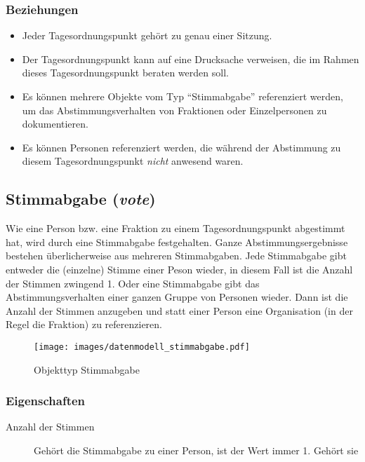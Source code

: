 \documentclass[,a4paper]{article}
\makeatletter
\def\maxwidth{\ifdim\Gin@nat@width>\linewidth\linewidth
\else\Gin@nat@width\fi}
\let\Oldincludegraphics\includegraphics
\renewcommand{\includegraphics}[1]{\Oldincludegraphics[width=\maxwidth]{#1}}
\makeatother
\begin{document}
\subsubsection{Beziehungen}

\begin{itemize}
\item
  Jeder Tagesordnungspunkt gehört zu genau einer Sitzung.
\item
  Der Tagesordnungspunkt kann auf eine Drucksache verweisen, die im
  Rahmen dieses Tagesordnungspunkt beraten werden soll.
\item
  Es können mehrere Objekte vom Typ ``Stimmabgabe'' referenziert werden,
  um das Abstimmungsverhalten von Fraktionen oder Einzelpersonen zu
  dokumentieren.
\item
  Es können Personen referenziert werden, die während der Abstimmung zu
  diesem Tagesordnungspunkt \emph{nicht} anwesend waren.
\end{itemize}

\subsection{Stimmabgabe (\emph{vote})}

Wie eine Person bzw. eine Fraktion zu einem Tagesordnungspunkt
abgestimmt hat, wird durch eine Stimmabgabe festgehalten. Ganze
Abstimmungsergebnisse bestehen überlicherweise aus mehreren
Stimmabgaben. Jede Stimmabgabe gibt entweder die (einzelne) Stimme einer
Peson wieder, in diesem Fall ist die Anzahl der Stimmen zwingend 1. Oder
eine Stimmabgabe gibt das Abstimmungsverhalten einer ganzen Gruppe von
Personen wieder. Dann ist die Anzahl der Stimmen anzugeben und statt
einer Person eine Organisation (in der Regel die Fraktion) zu
referenzieren.

\begin{figure}[htbp]
\centering
\texttt{[image: images/datenmodell\_stimmabgabe.pdf]}
\caption{Objekttyp Stimmabgabe}
\end{figure}

\subsubsection{Eigenschaften}

\begin{description}
\item[Anzahl der Stimmen]
Gehört die Stimmabgabe zu einer Person, ist der Wert immer 1. Gehört sie
\end{description}
\end{document}
